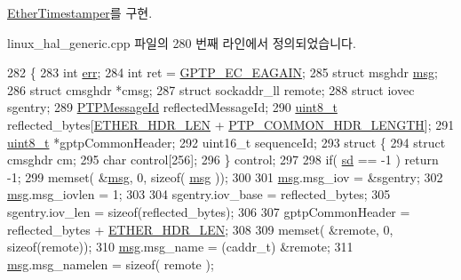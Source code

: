 \hyperlink{class_ether_timestamper_a82619058d136ce4314189f1c9db91914}{Ether\+Timestamper}를 구현.



linux\+\_\+hal\+\_\+generic.\+cpp 파일의 280 번째 라인에서 정의되었습니다.


\begin{DoxyCode}
282 \{
283     \textcolor{keywordtype}{int} \hyperlink{gst__avb__playbin_8c_a6ce68847c12434f60d1b2654a3dc3409}{err};
284     \textcolor{keywordtype}{int} ret = \hyperlink{ieee1588_8hpp_aee74e806e4f7deb78c6adee61f5dac87}{GPTP\_EC\_EAGAIN};
285     \textcolor{keyword}{struct }msghdr \hyperlink{maap__log__linux_8c_a0c7e58a50354c4a4d6dad428d0e47029}{msg};
286     \textcolor{keyword}{struct }cmsghdr *cmsg;
287     \textcolor{keyword}{struct }sockaddr\_ll remote;
288     \textcolor{keyword}{struct }iovec sgentry;
289     \hyperlink{class_p_t_p_message_id}{PTPMessageId} reflectedMessageId;
290     \hyperlink{stdint_8h_aba7bc1797add20fe3efdf37ced1182c5}{uint8\_t} reflected\_bytes[\hyperlink{ptptypes_8hpp_a4e7484afbe095e65767c43feb3a106cf}{ETHER\_HDR\_LEN} + 
      \hyperlink{avbts__message_8hpp_a8ec4d965b7b1e83844f1c17f12e9b8e4}{PTP\_COMMON\_HDR\_LENGTH}];
291     \hyperlink{stdint_8h_aba7bc1797add20fe3efdf37ced1182c5}{uint8\_t} *gptpCommonHeader;
292     uint16\_t sequenceId;
293     \textcolor{keyword}{struct }\{
294         \textcolor{keyword}{struct }cmsghdr cm;
295         \textcolor{keywordtype}{char} control[256];
296     \} control;
297 
298     \textcolor{keywordflow}{if}( \hyperlink{class_linux_timestamper_generic_a06b0afe769d54ae94259d8532bc878b0}{sd} == -1 ) \textcolor{keywordflow}{return} -1;
299     memset( &\hyperlink{maap__log__linux_8c_a0c7e58a50354c4a4d6dad428d0e47029}{msg}, 0, \textcolor{keyword}{sizeof}( \hyperlink{maap__log__linux_8c_a0c7e58a50354c4a4d6dad428d0e47029}{msg} ));
300 
301     \hyperlink{maap__log__linux_8c_a0c7e58a50354c4a4d6dad428d0e47029}{msg}.msg\_iov = &sgentry;
302     \hyperlink{maap__log__linux_8c_a0c7e58a50354c4a4d6dad428d0e47029}{msg}.msg\_iovlen = 1;
303 
304     sgentry.iov\_base = reflected\_bytes;
305     sgentry.iov\_len = \textcolor{keyword}{sizeof}(reflected\_bytes);
306 
307     gptpCommonHeader = reflected\_bytes + \hyperlink{ptptypes_8hpp_a4e7484afbe095e65767c43feb3a106cf}{ETHER\_HDR\_LEN};
308 
309     memset( &remote, 0, \textcolor{keyword}{sizeof}(remote));
310     \hyperlink{maap__log__linux_8c_a0c7e58a50354c4a4d6dad428d0e47029}{msg}.msg\_name = (caddr\_t) &remote;
311     \hyperlink{maap__log__linux_8c_a0c7e58a50354c4a4d6dad428d0e47029}{msg}.msg\_namelen = \textcolor{keyword}{sizeof}( remote );

\end{DoxyCode}
